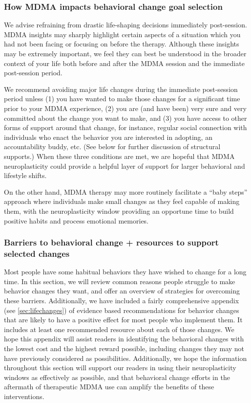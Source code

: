 \documentclass[12pt,letterpaper]{book}
\begin{document}
\subsubsection*{How MDMA impacts behavioral change goal selection}

We advise refraining from drastic life-shaping decisions immediately post-session. MDMA insights may sharply highlight certain aspects of a situation which you had not been facing or focusing on before the therapy. Although these insights may be extremely important, we feel they can best be understood in the broader context of your life both before and after the MDMA session and the immediate post-session period.

We recommend avoiding major life changes during the immediate post-session period unless (1) you have wanted to make those changes for a significant time prior to your MDMA experience, (2) you are (and have been) very sure and very committed about the change you want to make, and (3) you have access to other forms of support around that change, for instance, regular social connection with individuals who enact the behavior you are interested in adopting, an accountability buddy, etc. (See below for further discussion of structural supports.)  When these three conditions are met, we are hopeful that MDMA neuroplasticity could provide a helpful layer of support for larger behavioral and lifestyle shifts.

On the other hand, MDMA therapy may more routinely facilitate a “baby steps” approach where individuals make small changes as they feel capable of making them, with the neuroplasticity window providing an opportune time to build positive habits and process emotional memories.

\subsubsection*{Barriers to behavioral change + resources to support selected changes}

Most people have some habitual behaviors they have wished to change for a long time. In this section, we will review common reasons people struggle to make behavior changes they want, and offer an overview of strategies for overcoming these barriers. Additionally, we have included a fairly comprehensive appendix (see \ref{sec:lifechanges}) of evidence based recommendations for behavior changes that are likely to have a positive effect for most people who implement them. It includes at least one recommended resource about each of those changes. We hope this appendix will assist readers in identifying the behavioral changes with the lowest cost and the highest reward possible, including changes they may not have previously considered as possibilities. Additionally, we hope the information throughout this section will support our readers in using their neuroplasticity windows as effectively as possible, and that behavioral change efforts in the aftermath of therapeutic MDMA use can amplify the benefits of these interventions.
\end{document}
